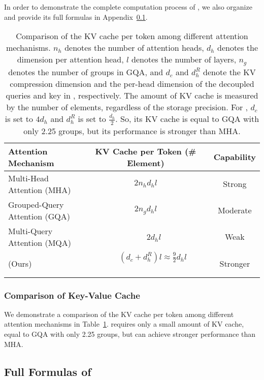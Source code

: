 In order to demonstrate the complete computation process of \dsattn{}, we also organize and provide its full formulas in Appendix~\ref{app:full_formulas}. 

\begin{table}[!t]
\centering
\setlength{\tabcolsep}{12pt}
\begin{tabular}{@{}l c c@{}}
\toprule
\textbf{Attention Mechanism} & \textbf{KV Cache per Token (\# Element)} & \textbf{Capability} \\
\midrule
Multi-Head Attention (MHA) & $2 n_{h} d_{h} l$ & Strong \\
Grouped-Query Attention (GQA) & $2 n_{g} d_{h} l$ & Moderate \\
Multi-Query Attention (MQA) & ~~~~$2 d_{h} l$ & Weak \\
\midrule
\dsattn{} (Ours) & $~~~~~~~~(d_{c} + d_h^R)l \approx \frac{9}{2} d_{h} l$~~~~~~~~~~~~~~~~~~~~~~~ & Stronger \\
\bottomrule
\end{tabular}
\caption{
Comparison of the KV cache per token among different attention mechanisms. 
$n_{h}$ denotes the number of attention heads, 
$d_{h}$ denotes the dimension per attention head, 
$l$ denotes the number of layers, 
$n_{g}$ denotes the number of groups in GQA, 
and $d_{c}$ and $d_h^R$ denote the KV compression dimension and the per-head dimension of the decoupled queries and key in \dsattn{}, respectively. 
The amount of KV cache is measured by the number of elements, regardless of the storage precision.
For \dsvii{}, $d_{c}$ is set to $4d_{h}$ and $d_h^R$ is set to $\frac{d_{h}}{2}$. 
So, its KV cache is equal to GQA with only 2.25 groups, but its performance is stronger than MHA. 
}
\label{tab:kv_cache_comp}
\end{table}

\subsubsection{Comparison of Key-Value Cache}

We demonstrate a comparison of the KV cache per token among different attention mechanisms in Table~\ref{tab:kv_cache_comp}. 
\dsattn{} requires only a small amount of KV cache, equal to GQA with only 2.25 groups, but can achieve stronger performance than MHA. 

\subsection{Full Formulas of \dsattn{}}
\label{app:full_formulas}

